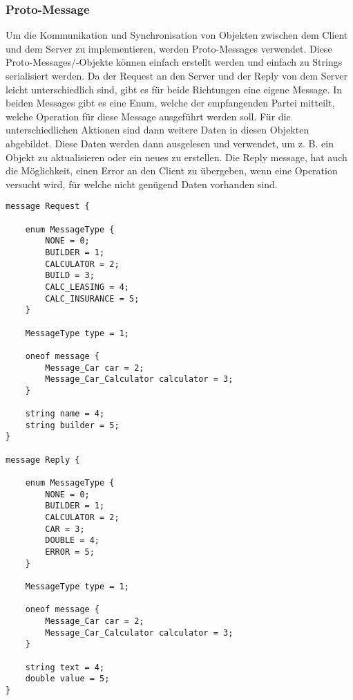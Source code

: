 \subsubsection{Proto-Message}
Um die Kommunikation und Synchronisation von Objekten zwischen dem Client und dem Server zu implementieren, werden Proto-Messages verwendet. Diese Proto-Messages/-Objekte können einfach erstellt werden und einfach zu Strings serialisiert werden. Da der Request an den Server und der Reply von dem Server leicht unterschiedlich sind, gibt es für beide Richtungen eine eigene Message. In beiden Messages gibt es eine Enum, welche der empfangenden Partei mitteilt, welche Operation für diese Message ausgeführt werden soll. Für die unterschiedlichen Aktionen sind dann weitere Daten in diesen Objekten abgebildet. Diese Daten werden dann ausgelesen und verwendet, um z. B. ein Objekt zu aktualisieren oder ein neues zu erstellen. Die Reply message, hat auch die Möglichkeit, einen Error an den Client zu übergeben, wenn eine Operation versucht wird, für welche nicht genügend Daten vorhanden sind.


\vspace{20mm}
\begin{addmargin}[-3em]{0em}
\begin{verbatim}
message Request {

    enum MessageType {
        NONE = 0;
        BUILDER = 1;
        CALCULATOR = 2;
        BUILD = 3;
        CALC_LEASING = 4;
        CALC_INSURANCE = 5;
    }

    MessageType type = 1;
    
    oneof message {
        Message_Car car = 2;
        Message_Car_Calculator calculator = 3;
    }
    
    string name = 4;
    string builder = 5;
}

message Reply {

    enum MessageType {
        NONE = 0;
        BUILDER = 1;
        CALCULATOR = 2;
        CAR = 3;
        DOUBLE = 4;
        ERROR = 5;
    }

    MessageType type = 1;
    
    oneof message {
        Message_Car car = 2;
        Message_Car_Calculator calculator = 3;
    }

    string text = 4;
    double value = 5;
}
\end{verbatim}
\end{addmargin}